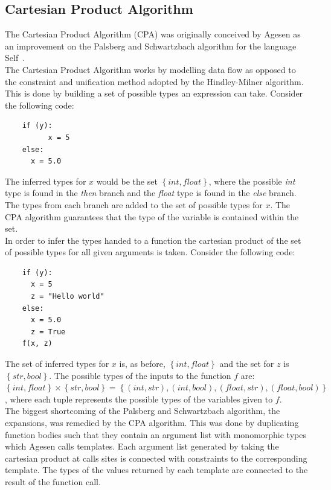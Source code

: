 \documentclass[12pt, titlepage]{article}
\begin{document}
\subsection{Cartesian Product Algorithm}
The Cartesian Product Algorithm (CPA) was originally conceived by Agesen as an improvement on the Palsberg and Schwartzbach algorithm for the language Self~\cite{agesen95}. \\
The Cartesian Product Algorithm works by modelling data flow as opposed to the constraint and unification method adopted by the Hindley-Milner algorithm. This is done by building a set of possible types an expression can take. Consider the following code:
\begin{lstlisting}
	if (y):	
          x = 5     
	else:
	  x = 5.0  
\end{lstlisting}
The inferred types for $x$ would be the set $\left\{ {int, float}\right\}$, where the possible \textit{int} type is found in the \textit{then} branch and the \textit{float} type is found in the \textit{else} branch. The types from each branch are added to the set of possible types for $x$. The CPA algorithm guarantees that the type of the variable is contained within the set. \\
In order to infer the types handed to a function the cartesian product of the set of possible types for all given arguments is taken. Consider the following code:
\begin{lstlisting}
	if (y):	
	  x = 5 
	  z = "Hello world"    
	else:
	  x = 5.0 
	  z = True
	f(x, z)
\end{lstlisting}
The set of inferred types for $x$ is, as before, $\left\{ {int, float}\right\}$ and the set for $z$ is $\left\{ {str, bool}\right\}$. The possible types of the inputs to the function $f$ are: $\left\{ {int, float}\right\} \times \left\{ {str, bool}\right\} = \left\{ {(int, str), (int, bool), (float, str), (float, bool)}\right\}$, where each tuple represents the possible types of the variables given to $f$. \\
The biggest shortcoming of the Palsberg and Schwartzbach algorithm, the expansions, was remedied by the CPA algorithm. This was done by duplicating function bodies such that they contain an argument list with monomorphic types which Agesen calls templates. Each argument list generated by taking the cartesian product at calls sites is connected with constraints to the corresponding template. The types of the values returned by each template are connected to the result of the function call.
\end{document}
